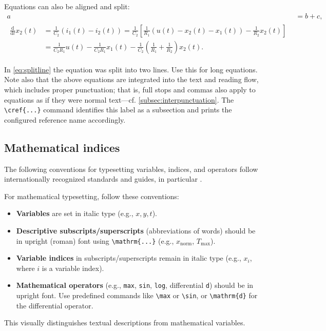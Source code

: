 Equations can also be aligned and split:
\begin{align}
	a & =b+c, \\
	\begin{split}
		\frac{\mathrm{d}}{\mathrm{d}t}x_2(t) & = \frac{1}{C_2} \left( i_1(t)-i_2(t)\right)= \frac{1}{C_2} \left[ \frac{1}{R_1} \left(u(t)-x_2(t)-x_1(t) \right)-\frac{1}{R_2} x_2(t)\right] \\
		                                     & = \frac{1}{C_2 R_1} u(t)-\frac{1}{C_2 R_1} x_1(t) - \frac{1}{C_2} \left( \frac{1}{R_1}+\frac{1}{R_2}\right) x_2(t).
		\label{eq:splitline}
	\end{split}
\end{align}

In \eqref{eq:splitline} the equation was split into two lines. Use this for long equations. Note also that the above equations are integrated into the text and reading flow, which includes proper punctuation; that is, full stops and commas also apply to equations as if they were normal text---cf. \cref{subsec:interpunctuation}. The \verb|\cref{...}| command identifies this label as a subsection and prints the configured reference name accordingly.

\subsection{Mathematical indices}

The following conventions for typesetting variables, indices, and operators follow internationally recognized standards and guides, in particular \cite{ISO80000-2-2019,NIST-SP-811}.

\begin{infobox}[title={Index and operator rules}]
	For mathematical typesetting, follow these conventions:

	\begin{itemize}
		\item \textbf{Variables} are set in italic type (e.g., $x, y, t$).
		\item \textbf{Descriptive subscripts/superscripts} (abbreviations of words) should be in upright (roman) font using \verb|\mathrm{...}| (e.g., $x_\mathrm{norm}$, $T_\mathrm{max}$).
		\item \textbf{Variable indices} in subscripts/superscripts remain in italic type (e.g., $x_i$, where $i$ is a variable index).
		\item \textbf{Mathematical operators} (e.g., \texttt{max}, \texttt{sin}, \texttt{log}, differential \texttt{d}) should be in upright font. Use predefined commands like \verb|\max| or \verb|\sin|, or \verb|\mathrm{d}| for the differential operator.
	\end{itemize}
	This visually distinguishes textual descriptions from mathematical variables.
\end{infobox}

